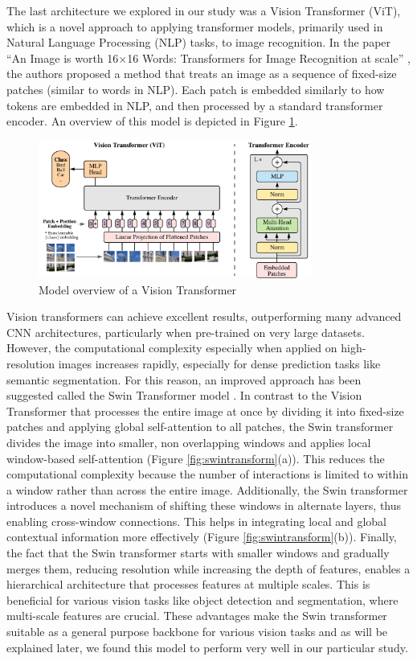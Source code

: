 \documentclass[a4paper,11pt]{article}
\begin{document}
The last architecture we explored in our study was a Vision Transformer (ViT), which is a novel approach to applying transformer models, primarily used in Natural Language Processing (NLP) tasks, to image recognition. In the paper ``An Image is worth 16$\times$16 Words: Transformers for Image Recognition at scale'' \cite{DBLP:journals/corr/abs-2010-11929}, the authors proposed a method that treats an image as a sequence of fixed-size patches (similar to words in NLP). Each patch is embedded similarly to how tokens are embedded in NLP, and then processed by a standard transformer encoder. An overview of this model is depicted in Figure \ref{fig:vit-arch}.

\begin{figure}
    \centering 
    \includegraphics[width=0.8\textwidth]{model_scheme.pdf}
    \caption{Model overview of a Vision Transformer \cite{DBLP:journals/corr/RonnebergerFB15}}
    \label{fig:vit-arch}
\end{figure}

Vision transformers can achieve excellent results, outperforming many advanced CNN architectures, particularly when pre-trained on very large datasets. However, the computational complexity especially when applied on high-resolution images increases rapidly, especially for dense prediction tasks like semantic segmentation. For this reason, an improved approach has been suggested called the Swin Transformer model \cite{DBLP:journals/corr/abs-2103-14030}. In contrast to the Vision Transformer that processes the entire image at once by dividing it into fixed-size patches and applying global self-attention to all patches, the Swin transformer divides the image into smaller, non overlapping windows and applies local window-based self-attention (Figure \ref{fig:swintransform}(a)). This reduces the computational complexity because the number of interactions is limited to within a window rather than across the entire image. Additionally, the Swin transformer introduces a novel mechanism of shifting these windows in alternate layers, thus enabling cross-window connections. This helps in integrating local and global contextual information more effectively (Figure \ref{fig:swintransform}(b)). Finally, the fact that the Swin transformer starts with smaller windows and gradually merges them, reducing resolution while increasing the depth of features, enables a hierarchical architecture that processes features at multiple scales. This is beneficial for various vision tasks like object detection and segmentation, where multi-scale features are crucial. These advantages make the Swin transformer suitable as a general purpose backbone for various vision tasks and as will be explained later, we found this model to perform very well in our particular study.
\end{document}
